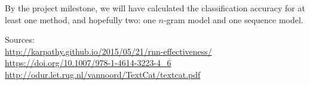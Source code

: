 \documentclass[11pt,letterpaper]{article}
\numberwithin{equation}{section}
\numberwithin{figure}{section}
\begin{document}
By the project milestone, we will have calculated the classification accuracy for at least one method, and hopefully two: one $n$-gram model and one sequence model.


Sources:\\
\url{http://karpathy.github.io/2015/05/21/rnn-effectiveness/}\\
\url{https://doi.org/10.1007/978-1-4614-3223-4_6}\\
\url{http://odur.let.rug.nl/vannoord/TextCat/textcat.pdf}
\end{document}
